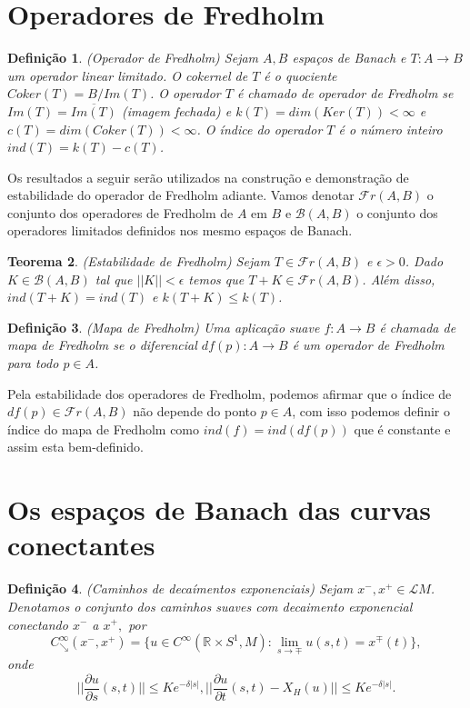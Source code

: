 \documentclass[12pt]{book}
\newtheorem{teorema}{Teorema}[section]
\newtheorem{definicao}[teorema]{Definição}
\newcommand{\aplicaoessuavesreatacirculo}{C^{\infty}(\retacartesianocirculo, M)}
\newcommand{\caminhosdecaimentoexponencial}[2]{C^{\infty}_{\searrow}(#1, #2)}
\newcommand{\caminhosdecaimentoexponencialpadrao}{\caminhosdecaimentoexponencial{x^{-}}{x^{+}}}
\newcommand{\circulo}{S^{1}}
\newcommand{\derivadaparcial}[2]{\frac{\partial #1}{\partial #2}}
\newcommand{\normagrande}[1]{\Big|\Big|#1\Big|\Big|}
\newcommand{\operadoresfredholm}[2]{\mathcal{F}r(#1, #2)}
\newcommand{\operadoreslimitados}[2]{\mathcal{B}(#1, #2)}
\newcommand{\retacartesianocirculo}{\real{} \times \circulo}
\newcommand{\real}[1]{\mathbb{R}^{#1}}
\newcommand{\solucoesperiodicascontrateis}{\mathcal{L}M}
\begin{document}
	\section{Operadores de Fredholm}
	\begin{definicao}\label{definicao_oeprador_fredholm}
		(Operador de Fredholm) Sejam $A, B$ espaços de Banach e $T: A\to B$ um operador linear limitado. O cokernel de $T$ é o quociente $Coker(T)=B/Im(T)$. O operador $T$ é chamado de operador de Fredholm se $Im(T)=\overline{Im(T)}$ (imagem fechada) e $k(T) = dim(Ker(T)) < \infty$ e $c(T)=dim(Coker(T)) < \infty$. O índice do operador $T$ é o número inteiro $ind(T) = k(T) - c(T)$.  
	\end{definicao}
	
	Os resultados a seguir serão utilizados na construção e demonstração de estabilidade do operador de Fredholm adiante. Vamos denotar $\operadoresfredholm{A}{B}$ o conjunto dos operadores de Fredholm de $A$ em $B$ e $\operadoreslimitados{A}{B}$ o conjunto dos operadores limitados definidos nos mesmo espaços de Banach.

	\begin{teorema}\label{teorema_estabilidade_fredholm}
		(Estabilidade de Fredholm) Sejam  $T \in \operadoresfredholm{A}{B}$ e $\epsilon>0$. Dado $K \in \operadoreslimitados{A}{B}$ tal que $||K|| < \epsilon$ temos que $T+K \in \operadoresfredholm{A}{B}$. Além disso, $ind(T+K)=ind(T)$ e $k(T+K) \leq k(T)$.
	\end{teorema}
	
	\begin{definicao}
		(Mapa de Fredholm) Uma aplicação suave $f: A \to B$ é chamada de mapa de Fredholm se o diferencial $df(p): A \to B$ é um operador de Fredholm para todo $p \in A$.
	\end{definicao}
	
	
	Pela estabilidade dos operadores de Fredholm, podemos afirmar que o índice de $df(p) \in \operadoresfredholm{A}{B}$ não depende do ponto $p \in A$, com isso podemos definir o índice do mapa de Fredholm como $ind(f)=ind(df(p))$ que é constante e assim esta bem-definido.
	
	\section{Os espaços de Banach das curvas conectantes}
	
	\begin{definicao}\label{definicao_caminhos_decaimentos_exponenciais}
		(Caminhos de decaímentos exponenciais) Sejam $x^{-}, x^{+} \in \solucoesperiodicascontrateis$. Denotamos o conjunto dos caminhos suaves com decaimento exponencial conectando $x^{-}$ a $x^{+}, $ por
		$$
		\caminhosdecaimentoexponencialpadrao = \{u \in \aplicaoessuavesreatacirculo: \lim_{s \to \mp} u(s,t) = x^{\mp}(t) \},
		$$
		onde 
		$$
		\normagrande{\derivadaparcial{u}{s}(s,t)} \leq Ke^{-\delta|s|},  \normagrande{\derivadaparcial{u}{t}(s,t) -X_{H}(u)} \leq Ke^{-\delta|s|}.
		$$
	\end{definicao}
	
\end{document}
